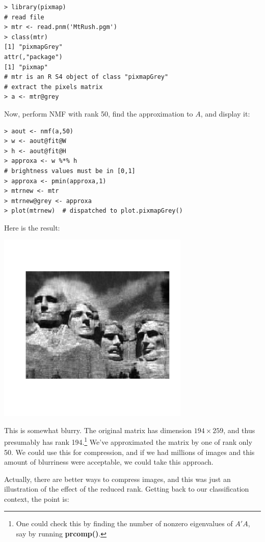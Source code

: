 \begin{lstlisting}
> library(pixmap) 
# read file
> mtr <- read.pnm('MtRush.pgm') 
> class(mtr)
[1] "pixmapGrey"
attr(,"package")
[1] "pixmap"
# mtr is an R S4 object of class "pixmapGrey"
# extract the pixels matrix
> a <- mtr@grey
\end{lstlisting}

Now, perform NMF with rank 50, find the approximation to $A$, and
display it:

\begin{lstlisting}
> aout <- nmf(a,50)
> w <- aout@fit@W
> h <- aout@fit@H
> approxa <- w %*% h
# brightness values must be in [0,1]
> approxa <- pmin(approxa,1) 
> mtrnew <- mtr
> mtrnew@grey <- approxa 
> plot(mtrnew)  # dispatched to plot.pixmapGrey()
\end{lstlisting}

Here is the result:

\includegraphics[width=3.6in]{Images/MtRush50.png}

This is somewhat blurry.  The original matrix has dimension $194 \times
259$, and thus presumably has rank 194.\footnote{One could check this by
finding the number of nonzero eigenvalues of $A'A$, say by running
\textbf{prcomp()}.} We've approximated the matrix by one of rank only
50.  We could use this for compression, and if we had millions of
images and this amount of blurriness were acceptable, we could take this
approach.

Actually, there are better ways to compress images, and this was just an
illustration of the effect of the reduced rank.  Getting back to our
classification context, the point is:

